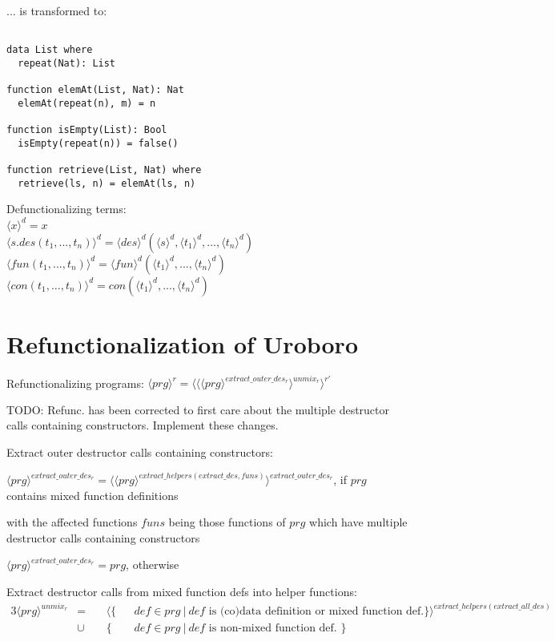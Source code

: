\documentclass[11pt]{article} %
\begin{document}
... is transformed to:

\begin{lstlisting}

data List where
  repeat(Nat): List

function elemAt(List, Nat): Nat
  elemAt(repeat(n), m) = n

function isEmpty(List): Bool
  isEmpty(repeat(n)) = false()

function retrieve(List, Nat) where
  retrieve(ls, n) = elemAt(ls, n)

\end{lstlisting}

Defunctionalizing terms: \\
$\langle x \rangle^d = x$ \\
$\langle s.des(t_1, ..., t_n) \rangle^d = \langle des \rangle^d (\langle s \rangle^d, \langle t_1 \rangle^d, ..., \langle t_n \rangle^d)$ \\
$\langle fun(t_1, ..., t_n) \rangle^d = \langle fun \rangle^d (\langle t_1 \rangle^d, ..., \langle t_n \rangle^d)$ \\
$\langle con(t_1, ..., t_n) \rangle^d = con(\langle t_1 \rangle^d, ..., \langle t_n \rangle^d)$ \\

\section{Refunctionalization of Uroboro}

Refunctionalizing programs: $\langle prg \rangle^r = \langle \langle \langle prg \rangle^{extract\_outer\_des_r} \rangle^{unmix_r} \rangle^{r'}$

TODO: Refunc. has been corrected to first care about the
multiple destructor calls containing constructors. Implement these changes.

Extract outer destructor calls containing constructors:

$\langle prg \rangle^{extract\_outer\_des_r} = \langle \langle prg \rangle^{extract\_helpers(extract\_des, funs)} \rangle^{extract\_outer\_des_r}$, if $prg$ contains mixed function definitions

with the affected functions $funs$ being those functions of $prg$ which have multiple destructor calls containing constructors

$\langle prg \rangle^{extract\_outer\_des_r} = prg$, otherwise


Extract destructor calls from mixed function defs into helper functions:
\begin{alignat*}{3}
\langle prg \rangle^{unmix_r} & = ~&& \langle \{ && def \in prg ~ | ~ def \textrm{ is (co)data definition or mixed function def.} \} \rangle^{extract\_helpers(extract\_all\_des)} \\
&\cup && \{ && def \in prg ~ | ~ def \textrm{ is non-mixed function def. } \}
\end{alignat*}
\end{document}

